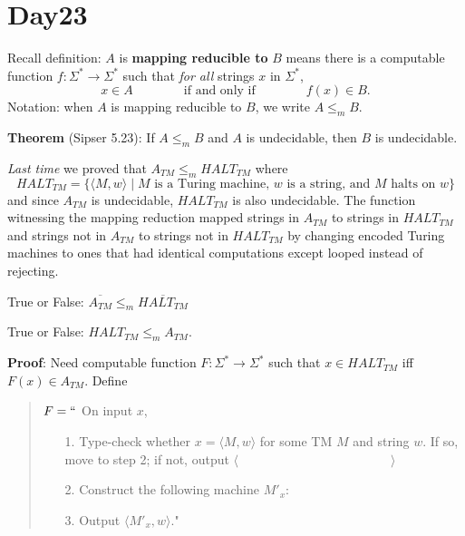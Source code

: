 \documentclass[12pt, oneside]{article}
\begin{document}
\begin{flushright}
\end{flushright} \section*{Day23}



Recall definition:  $A$ is  {\bf  mapping  reducible to} $B$  means there is a computable function 
$f : \Sigma^* \to \Sigma^*$ such that {\it for all} strings  $x$ in $\Sigma^*$, 
\[
x  \in  A \qquad \qquad \text{if and  only  if} \qquad \qquad f(x) \in B.
\]
Notation:  when $A$  is mapping reducible to $B$, we write $A  \leq_m B$.

{\bf Theorem} (Sipser 5.23): If $A \leq_m B$ and $A$ is undecidable, then $B$ is undecidable.
    

{\it Last time} we proved that $A_{TM} \le_m HALT_{TM}$ where
    \[
    HALT_{TM} = \{ \langle M, w \rangle \mid \text{$M$ is a  Turing machine, $w$ is  a string, and $M$ halts on $w$} \}
    \]
and since $A_{TM}$ is undecidable, $HALT_{TM}$ is also undecidable. The function 
witnessing the mapping reduction mapped strings in $A_{TM}$ to strings in $HALT_{TM}$ and 
strings not in $A_{TM}$ to strings not in $HALT_{TM}$ by changing encoded Turing machines to 
ones that had identical computations except looped instead of rejecting.


True or False: $\overline{A_{TM}} \leq_m \overline{HALT_{TM}}$

\vfill

True or False: $HALT_{TM} \leq_m A_{TM}$.

{\bf Proof}: Need computable function  $F: \Sigma^* \to \Sigma^*$  such that  
$x \in HALT_{TM}$ iff $F(x)  \in  A_{TM}$.
Define

\vspace{-15pt}

\begin{quote}
$F =  ``$ On input $x$,
\begin{itemize}
\item[1.] Type-check whether  $x = \langle M, w \rangle$ for some TM $M$ and string $w$. 
If so, move to step 2; if  not, output  $\langle \hspace{2in} \rangle$
\item[2.] Construct the following machine $M'_x$:
\vspace{50pt}
\item[3.] Output $\langle M'_x , w\rangle$."
\end{itemize}
\end{quote}
\end{document}

